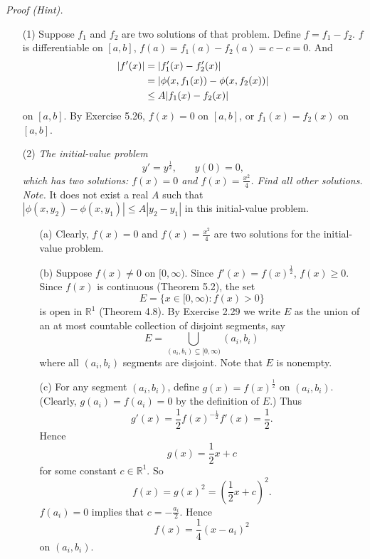\documentclass{article}
\begin{document}
\emph{Proof (Hint).}
\begin{enumerate}
\item[(1)]
Suppose $f_1$ and $f_2$ are two solutions of that problem.
Define $f = f_1 - f_2$.
$f$ is differentiable on $[a,b]$, $f(a) = f_1(a) - f_2(a) = c - c = 0$.
And
\begin{align*}
  |f'(x)|
  &= |f_1'(x) - f_2'(x)| \\
  &= \abs{ \phi(x,f_1(x)) - \phi(x,f_2(x)) } \\
  &\leq A | f_1(x) - f_2(x) |
\end{align*}
on $[a,b]$.
By Exercise 5.26, $f(x) = 0$ on $[a,b]$, or $f_1(x) = f_2(x)$ on $[a,b]$.

\item[(2)]
\emph{The initial-value problem
\[
  y' = y^{\frac{1}{2}}, \:\:\:\:\:\:\:\: y(0) = 0,
\]
which has two solutions: $f(x) = 0$ and $f(x) = \frac{x^2}{4}$.
Find all other solutions.} \\

  \emph{Note.}
  It does not exist a real $A$ such that $|\phi(x,y_2) - \phi(x,y_1)| \leq A|y_2 - y_1|$
  in this initial-value problem.

  \begin{enumerate}
  \item[(a)]
  Clearly, $f(x) = 0$ and $f(x) = \frac{x^2}{4}$ are two solutions for the initial-value problem.

  \item[(b)]
  Suppose $f(x) \neq 0$ on $[0,\infty)$.
  Since $f'(x) = f(x)^{\frac{1}{2}}$, $f(x) \geq 0$.
  Since $f(x)$ is continuous (Theorem 5.2), the set
  \[
    E = \{ x \in [0, \infty) : f(x) > 0 \}
  \]
  is open in $\mathbb{R}^1$ (Theorem 4.8).
  By Exercise 2.29
  we write $E$ as the union of an at most countable collection of disjoint segments,
  say
  \[
    E = \bigcup_{(a_i,b_i) \subseteq [0, \infty)} (a_i,b_i)
  \]
  where all $(a_i,b_i)$ segments are disjoint.
  Note that $E$ is nonempty.

  \item[(c)]
  For any segment $(a_i,b_i)$,
  define $g(x) = f(x)^{\frac{1}{2}}$ on $(a_i,b_i)$.
  (Clearly, $g(a_i) = f(a_i) = 0$ by the definition of $E$.)
  Thus
  \[
    g'(x) = \frac{1}{2} f(x)^{-\frac{1}{2}} f'(x) = \frac{1}{2}.
  \]
  Hence
  \[
    g(x) = \frac{1}{2} x + c
  \]
  for some constant $c \in \mathbb{R}^1$.
  So
  \[
    f(x) = g(x)^2 = \left( \frac{1}{2} x + c \right)^2.
  \]
  $f(a_i) = 0$ implies that $c = -\frac{a_i}{2}$.
  Hence
  \[
    f(x) = \frac{1}{4}(x - a_i)^2
  \]
  on $(a_i,b_i)$.


\end{enumerate}
\end{enumerate}
\end{document}
